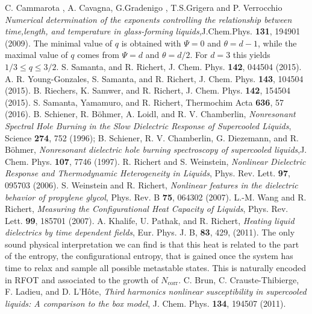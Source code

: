 \documentclass[single column,pre]{revtex4}
\begin{document}
\begin{thebibliography}{99}
 C. Cammarota ,  A. Cavagna, G.Gradenigo , T.S.Grigera and P. Verrocchio  \textit{Numerical determination of the exponents controlling the relationship between time,length, and temperature in glass-forming liquids},J.Chem.Phys. {\bf 131}, 194901 (2009). 
 The minimal value of $q$ is obtained with $\Psi =0$ and $\theta = d-1$, while the maximal value of $q$ comes from $\Psi = d$ and $\theta = d/2$. For $d=3$ this yields $1/3 \le q \le 3/2$.
 S. Samanta, and R. Richert, J. Chem. Phys. {\bf 142}, 044504 (2015).
 A. R. Young-Gonzales, S. Samanta, and R. Richert, J. Chem. Phys. {\bf 143}, 104504 (2015).
 B. Riechers, K. Samwer, and R. Richert, J. Chem. Phys. {\bf 142}, 154504 (2015).
 S. Samanta, Yamamuro, and R. Richert, Thermochim Acta {\bf 636}, 57 (2016).
 B. Schiener, R. B\"{o}hmer, A. Loidl, and R. V. Chamberlin, \textit{Nonresonant Spectral Hole Burning in the Slow Dielectric Response of Supercooled Liquids}, Science {\bf 274}, 752 (1996); B. Schiener, R. V. Chamberlin, G. Diezemann, and R. B\"{o}hmer, \textit{Nonresonant dielectric hole burning spectroscopy of supercooled liquids},J. Chem. Phys. {\bf 107}, 7746 (1997).
 R. Richert and S. Weinstein,\textit{ Nonlinear Dielectric Response and Thermodynamic Heterogeneity in Liquids}, Phys. Rev. Lett. {\bf 97}, 095703 (2006).
 S. Weinstein and R. Richert, \textit{Nonlinear features in the dielectric behavior of propylene glycol}, Phys. Rev. B {\bf 75}, 064302 (2007).
 L.-M. Wang and R. Richert, \textit{Measuring the Configurational Heat Capacity of Liquids}, Phys. Rev. Lett. {\bf 99}, 185701 (2007).
 A. Khalife, U. Pathak, and R. Richert, \textit{Heating liquid dielectrics by time dependent fields}, Eur. Phys. J. B, {\bf 83}, 429, (2011).
The only sound physical interpretation we can find is that this heat is related to the part of the entropy, the configurational entropy, that is gained once the system has time to relax and sample all possible metastable states. This is naturally encoded in RFOT and associated to the growth of $N_{\text{corr}}$.
 C. Brun, C. Crauste-Thibierge, F. Ladieu, and D. L'H\^ote, \textit{Third harmonics nonlinear susceptibility in supercooled liquids: A comparison to the box model}, J. Chem. Phys. {\bf 134}, 194507 (2011).

\end{thebibliography}
\end{document}
